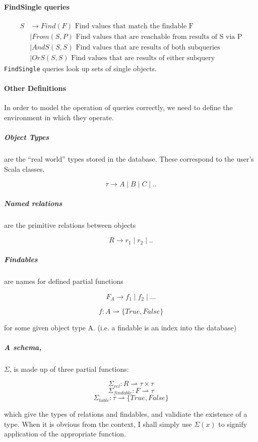 \documentclass[12pt,a4paper,twoside,openright]{report}
\newcommand\codeName[1]{\texttt{#1}}
\begin{document}
\paragraph{FindSingle queries}
\begin{equation}
\label{SDefinition}
\begin{split}
S & \rightarrow Find(F) \mbox{ Find values that match the findable F}\\
&\mid From(S, P) \mbox{ Find values that are reachable from results of S via P}\\
&\mid AndS(S, S) \mbox{ Find values that are results of both subqueries}\\
&\mid OrS(S, S) \mbox{ Find values that are results of either subquery}
\end{split}
\end{equation} 
\codeName{FindSingle} queries look up sets of single objects.\\

\paragraph{Other Definitions}
In order to model the operation of queries correctly, we need to define the environment in which they operate.

\subparagraph{Object Types} are the ``real world'' types stored in the database. These correspond to the user's Scala classes.

\[ \tau \rightarrow A \mid B \mid C \mid .. \]

\subparagraph{Named relations} are the primitive relations between objects

\[R \rightarrow r_1 \mid r_2 \mid .. \]

\subparagraph{Findables} are names for defined partial functions

\[F_A \rightarrow f_1 \mid f_2 \mid ... \]

\[f \colon A \rightharpoonup \{True, False\} \]

for some given object type A. (i.e. a findable is an index into the database)

\subparagraph{A schema,}$\Sigma$, is made up of three partial functions:

\[\Sigma_{rel}\colon R \rightharpoonup \tau\times\tau \]
\[\Sigma_{findable}\colon F \rightharpoonup \tau \]
\[\Sigma_{table}\colon \tau \rightharpoonup \{True, False\} \]

which give the types of relations and findables, and validiate the existence of a type. When it is obvious from the context, I shall simply use $\Sigma(x)$ to signify application of the appropriate function.
 
\end{document}

